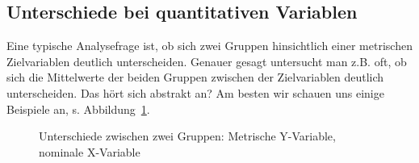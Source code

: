 \documentclass[
  letterpaper,
  twoside,
  open=any]{scrbook}
\theoremstyle{definition}
\theoremstyle{definition}
\theoremstyle{definition}
\theoremstyle{remark}
\begin{document}
\subsection{Unterschiede bei quantitativen
Variablen}\label{unterschiede-bei-quantitativen-variablen}

Eine typische Analysefrage ist, ob sich zwei Gruppen hinsichtlich einer
metrischen Zielvariablen deutlich unterscheiden. Genauer gesagt
untersucht man z.B. oft, ob sich die Mittelwerte der beiden Gruppen
zwischen der Zielvariablen deutlich unterscheiden. Das hört sich
abstrakt an? Am besten wir schauen uns einige Beispiele an, s.
Abbildung~\ref{fig-compare-groups1}.

\begin{figure}

\begin{minipage}{0.50\linewidth}



\end{minipage}%
%
\begin{minipage}{0.50\linewidth}



\end{minipage}%

\caption{\label{fig-compare-groups1}Unterschiede zwischen zwei Gruppen:
Metrische Y-Variable, nominale X-Variable}

\end{figure}%
\end{document}
